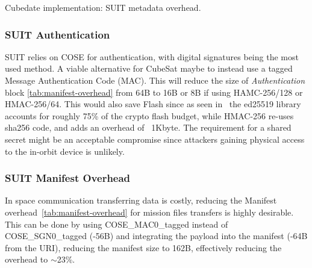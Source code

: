 \begin{table}[t]

\begin{adjustbox}{width=0.5\columnwidth,center}
    \centering
    
\end{adjustbox}
\caption{Cubedate implementation: SUIT metadata overhead.}
\label{tab:manifest-overhead}
\end{table}

\subsubsection{SUIT Authentication}

SUIT relies on COSE for authentication, with digital signatures being the most
used method. A viable alternative for CubeSat maybe to instead use a tagged Message
Authentication Code (MAC). This will reduce the size of \textit{Authentication} block
\ref*{tab:manifest-overhead} from 64B to 16B or 8B if using HAMC-256/128
or HMAC-256/64. This would also save Flash since as seen in~\cite{zandberg2019secure}
the ed25519 library accounts for roughly 75\% of the crypto flash budget, while HMAC-256
re-uses sha256 code, and adds an overhead of ~1Kbyte. The requirement for a shared secret
might be an acceptable compromise since attackers gaining physical access to the
in-orbit device is unlikely.

\subsubsection{SUIT Manifest Overhead}

In space communication transferring data is costly, reducing the Manifest
overhead~\ref{tab:manifest-overhead} for mission files transfers is highly
desirable. This can be done by using COSE\_MAC0\_tagged instead of
COSE\_SGN0\_tagged (-56B) and integrating the payload into the
manifest (-64B from the URI), reducing the manifest size to 162B,
effectively reducing the overhead to $\sim$23\%.

